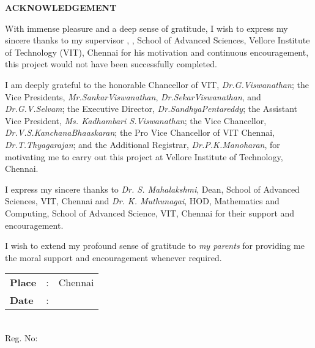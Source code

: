 
\thispagestyle{plain}
\begin{center}
	{\Large \bf \MakeUppercase{Acknowledgement}}
\end{center}

With immense pleasure and a deep sense of gratitude, I wish to express my sincere thanks to my supervisor \emph{\theguide}, \theguidedesignation, School of Advanced Sciences, Vellore Institute of Technology (VIT), Chennai for his motivation and continuous encouragement, this project would not have been successfully completed.

I am deeply grateful to the honorable Chancellor of VIT, {\em Dr.\;G.\;Viswanathan}; the Vice Presidents, 
{\em Mr.\;Sankar\;Viswanathan}, {\em Dr.\;Sekar\;Viswanathan}, and {\em Dr.\;G.\;V.\;Selvam}; the Executive 
Director, {\em Dr.\;Sandhya\;Pentareddy}; the Assistant Vice President,  {\em Ms. Kadhambari S.\;Viswanathan}; 
the Vice Chancellor, {\em Dr.\;V.\;S.\;Kanchana\;Bhaaskaran}; the Pro Vice Chancellor of VIT Chennai, 
{\em Dr.\;T.\;Thyagarajan}; and the Additional Registrar, {\em Dr.\;P.\;K.\;Manoharan}, for motivating me to carry 
out this project at Vellore Institute of Technology, Chennai.

 I express my sincere thanks to {\em Dr. S. Mahalakshmi}, Dean, School of Advanced Sciences, VIT, Chennai and {\em Dr. K. Muthunagai}, HOD, Mathematics and Computing, School of Advanced Science,  VIT, Chennai for their support and encouragement.


 I wish to extend my profound sense of gratitude to {\em my parents} for providing me the moral support and encouragement whenever required.   



\vspace{3\baselineskip}

\begingroup
\linespread{1} \selectfont

\begin{minipage}{.5\textwidth}
	\raggedright
	\begin{tabular}{lcl}
		\textbf{Place}  & : & Chennai \\
		\textbf{Date} & : &
	\end{tabular}
\end{minipage}%
\begin{minipage}{.5\textwidth}
		\raggedleft
		\thestudent\\
		Reg. No: \theregno\\
\end{minipage}

 \endgroup

